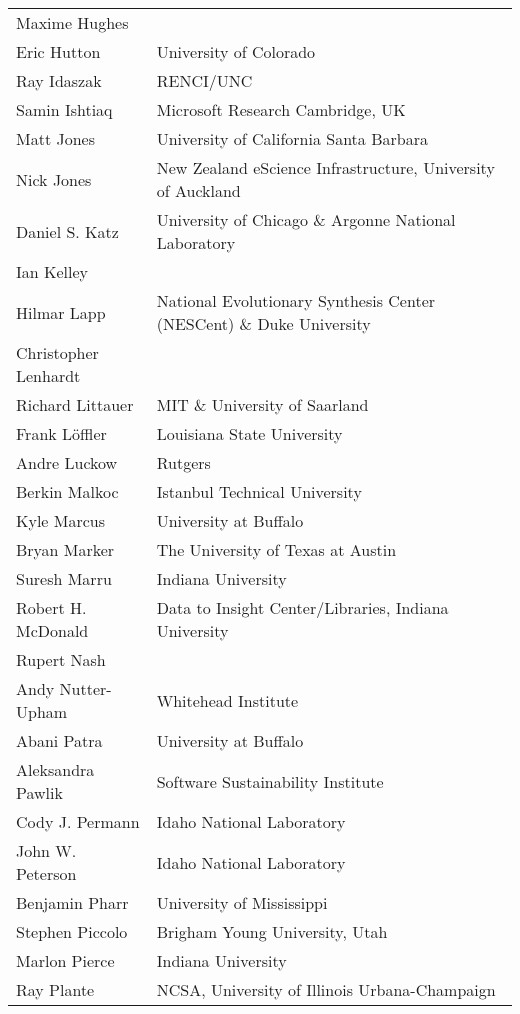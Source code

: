 \documentclass[11pt, oneside]{amsart}
\begin{document}
{\begin{longtable}{ll}
\\ Maxime Hughes
\\ Eric Hutton           &  University of Colorado
\\ Ray Idaszak           &  RENCI/UNC
\\ Samin Ishtiaq         &  Microsoft Research Cambridge, UK
\\ Matt Jones            &  University of California Santa Barbara
\\ Nick Jones            &  New Zealand eScience Infrastructure, University of Auckland
\\ Daniel S. Katz        &  University of Chicago \& Argonne National Laboratory
\\ Ian Kelley
\\ Hilmar Lapp           &  National Evolutionary Synthesis Center (NESCent) \& Duke University
\\ Christopher Lenhardt
\\ Richard Littauer      &  MIT \& University of Saarland
\\ Frank L\"{o}ffler     &  Louisiana State University
\\ Andre Luckow          &  Rutgers
\\ Berkin Malkoc         &  Istanbul Technical University
\\ Kyle Marcus           &  University at Buffalo
\\ Bryan Marker          &  The University of Texas at Austin
\\ Suresh Marru          &  Indiana University
\\ Robert H. McDonald    &  Data to Insight Center/Libraries, Indiana University
\\ Rupert Nash
\\ Andy Nutter-Upham     &  Whitehead Institute
\\ Abani Patra           &  University at Buffalo
\\ Aleksandra Pawlik     &  Software Sustainability Institute
\\ Cody J. Permann       &  Idaho National Laboratory
\\ John W. Peterson      &  Idaho National Laboratory
\\ Benjamin Pharr        &  University of Mississippi
\\ Stephen Piccolo       &  Brigham Young University, Utah
\\ Marlon Pierce         &  Indiana University
\\ Ray Plante            &  NCSA, University of Illinois Urbana-Champaign

\end{longtable}}
\end{document}
